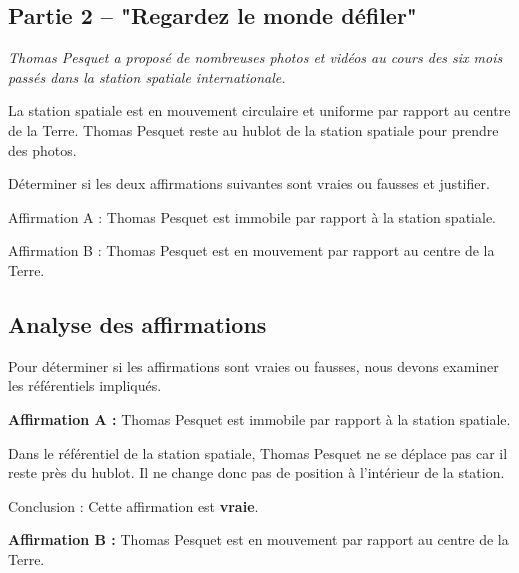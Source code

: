\documentclass[answers]{exam}
\begin{document}
\begin{questions}
\begin{solution}
\end{solution}

\subsection*{Partie 2 – "Regardez le monde défiler"}
  
\textit{Thomas Pesquet a proposé de nombreuses photos et vidéos au cours des six mois passés dans la station spatiale internationale.}

  \question[4] La station spatiale est en mouvement circulaire et uniforme par rapport au centre de la Terre. Thomas Pesquet reste au hublot de la station spatiale pour prendre des photos.
  
  Déterminer si les deux affirmations suivantes sont vraies ou fausses et justifier.
  
  \begin{compactitem}
  \item Affirmation A : Thomas Pesquet est immobile par rapport à la station spatiale.
  \item Affirmation B : Thomas Pesquet est en mouvement par rapport au centre de la Terre.
  \end{compactitem}
  
  

\begin{solution}

\subsection*{Analyse des affirmations}

Pour déterminer si les affirmations sont vraies ou fausses, nous devons examiner les référentiels impliqués.

\begin{compactitem}
    \item \textbf{Affirmation A :} Thomas Pesquet est immobile par rapport à la station spatiale.

    \begin{compactitem}
        \item Dans le référentiel de la station spatiale, Thomas Pesquet ne se déplace pas car il reste près du hublot. Il ne change donc pas de position à l'intérieur de la station. 
        \item Conclusion : Cette affirmation est \textbf{vraie}.
    \end{compactitem}

    \item \textbf{Affirmation B :} Thomas Pesquet est en mouvement par rapport au centre de la Terre.


\end{compactitem}
\end{solution}
\end{questions}
\end{document}
